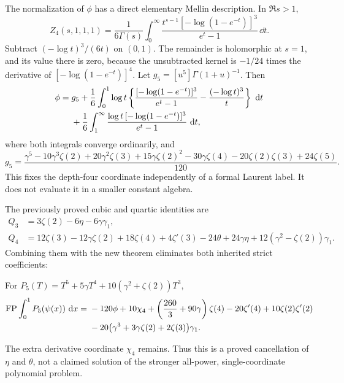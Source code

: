 The normalization of $\phi$ has a direct elementary Mellin
description. In $\Re s>1$,
\begin{equation}\label{hp:heightMellin}
 Z_4(s,1,1,1)=\frac1{6\Gamma(s)}
   \int_0^\infty\frac{t^{s-1}[-\log(1-e^{-t})]^3}{e^t-1}\,\dd t.
\end{equation}
Subtract $(-\log t)^3/(6t)$ on $(0,1)$. The remainder is
holomorphic at $s=1$, and its value there is zero, because the
unsubtracted kernel is $-1/24$ times the derivative of
$[-\log(1-e^{-t})]^4$. Let $g_5=[u^5]\Gamma(1+u)^{-1}$.
Then
\begin{align}\label{hp:phiIntegral}
 \phi={}&g_5+\frac16\int_0^1\log t
  \left\{\frac{[-\log(1-e^{-t})]^3}{e^t-1}
                      -\frac{(-\log t)^3}{t}\right\}\,\,\mathrm d t\notag\\
 &+\frac16\int_1^\infty
             \frac{\log t\,[-\log(1-e^{-t})]^3}{e^t-1}\,\,\mathrm d t,
\end{align}
where both integrals converge ordinarily, and
\[
 g_5=\frac{\gamma^5-10\gamma^3\zeta(2)+20\gamma^2\zeta(3)
        +15\gamma\zeta(2)^2-30\gamma\zeta(4)
        -20\zeta(2)\zeta(3)+24\zeta(5)}{120}.
\]
This fixes the depth-four coordinate independently of a formal
Laurent label. It does not evaluate it in a smaller constant algebra.

The previously proved cubic and quartic identities\cite{repo:cubic,repo:quartic} are
\begin{align*}
 Q_3&=3\zeta(2)-6\eta-6\gamma\gamma_1,\\
 Q_4&=12\zeta(3)-12\gamma\zeta(2)+18\zeta(4)+4\zeta'(3)
       -24\theta+24\gamma\eta
       +12(\gamma^2-\zeta(2))\gamma_1.
\end{align*}
Combining them with the new theorem eliminates both inherited
strict coefficients:
\begin{corollary}\label{hp:cancellation}
For $P_5(T)=T^5+5\gamma T^4+10(\gamma^2+\zeta(2))T^3$,
\begin{align}\label{hp:polyCancellation}
 \operatorname{FP}\int_0^1P_5(\psi(x))\,\,\mathrm d x
 ={}&-120\phi+10\chi_4+
              \left(\frac{260}{3}+90\gamma\right)\zeta(4)
           -20\zeta'(4)+10\zeta(2)\zeta'(2)\notag\\
 &-20\bigl(\gamma^3+3\gamma\zeta(2)+2\zeta(3)\bigr)\gamma_1.
\end{align}
\end{corollary}
The extra derivative coordinate $\chi_4$ remains. Thus this is a
proved cancellation of $\eta$ and $\theta$, not a claimed solution
of the stronger all-power, single-coordinate polynomial problem.

